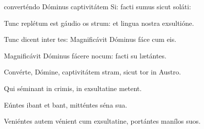 \item {} converténdo Dóminus captivitátem Si:\psstar{} facti sumus sicut soláti:

\item Tunc replétum est gáudio os strum:\psstar{} et lingua nostra exsultióne.

\item Tunc dicent inter tes:\psstar{} Magnificávit Dóminus fáce cum eis.

\item Magnificávit Dóminus fácere nocum:\psstar{} facti su lætántes.

\item Convérte, Dómine, captivitátem stram,\psstar{} sicut tor in Austro.

\item Qui séminant in crimis,\psstar{} in exsultatine metent.

\item Eúntes ibant et bant,\psstar{} mitténtes séna sua.

\item Veniéntes autem vénient cum exsultatine,\psstar{} portántes manílos suos.

